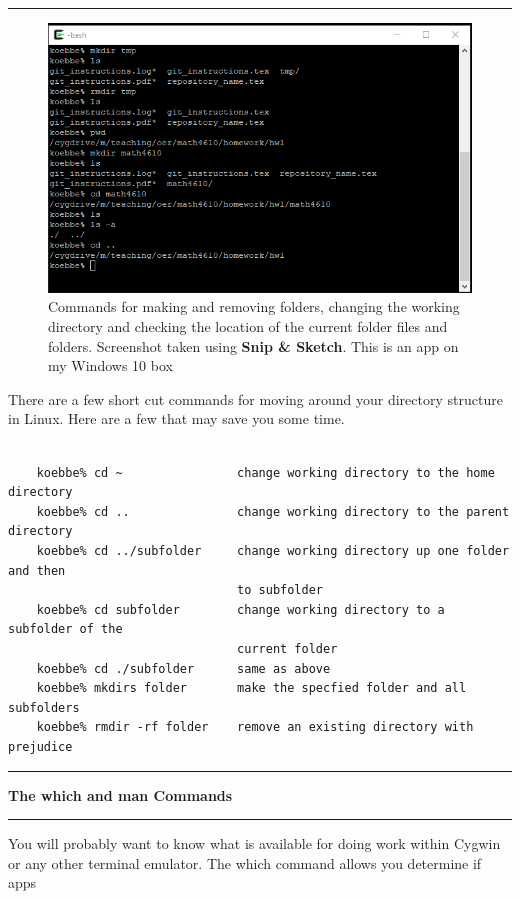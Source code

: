 \documentclass[10pt,fleqn]{article}
\begin{document}
\vskip0.1in\hrule\vskip0.1in
\vfill
\begin{figure}[h]
\centering
\includegraphics{../images/cygwin_03.png}
\caption{
  Commands for making and removing folders, changing the working directory and
  checking the location of the current folder files and folders. Screenshot
  taken using {\bf Snip \& Sketch}. This is an app on my Windows 10 box}
\end{figure}
\eject
\noindent
There are a few short cut commands for moving around your directory structure in
Linux. Here are a few that may save you some time.
\begin{verbatim}

    koebbe% cd ~                change working directory to the home directory
    koebbe% cd ..               change working directory to the parent directory
    koebbe% cd ../subfolder     change working directory up one folder and then
                                to subfolder 
    koebbe% cd subfolder        change working directory to a subfolder of the
                                current folder
    koebbe% cd ./subfolder      same as above
    koebbe% mkdirs folder       make the specfied folder and all subfolders
    koebbe% rmdir -rf folder    remove an existing directory with prejudice

\end{verbatim}
\vskip0.1in\hrule\vskip0.1in
\noindent
{\large{\bf The which and man Commands}} 
\vskip0.1in\hrule\vskip0.1in
\noindent
You will probably want to know what is available for doing work within Cygwin
or any other terminal emulator. The which command allows you determine if apps
\end{document}
